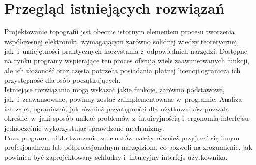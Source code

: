 \chapter{Przegląd istniejących rozwiązań}
\label{ch:przeglad_istniejacych_rozwiazan}

Projektowanie topografii jest obecnie istotnym elementem procesu tworzenia współczesnej elektroniki,
wymagającym zarówno solidnej wiedzy teoretycznej,
jak~i~umiejętności praktycznych korzystania z~odpowiednich narzędzi.
Dostępne na rynku programy wspierające ten proces oferują wiele zaawansowanych funkcji,
ale ich złożoność oraz częsta potrzeba posiadania płatnej licencji ogranicza ich przystępność dla osób początkujących.\\
\indent Istniejące rozwiązania mogą wskazać jakie funkcje, zarówno podstawowe, jak~i~zaawansowane,
powinny zostać zaimplementowane w~programie.
Analiza ich zalet, ograniczeń, jak również przystępności dla użytkowników pozwala określić,
w~jaki sposób unikać problemów z~intuicyjnością i~ergonomią interfejsu jednocześnie wykorzystując sprawdzone mechanizmy.\\
\indent Poza programami do tworzenia schematów należy również przyjrzeć się innym profesjonalnym lub półprofesjonalnym narzędziom,
co pozwoli na zrozumienie,
jak powinien być zaprojektowany schludny i~intuicyjny interfejs użytkownika.





